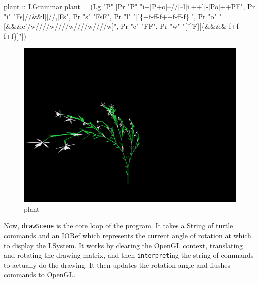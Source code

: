 \documentclass[]{article}
\makeatletter
\newenvironment{Shaded}{}{}
\newcommand{\DataTypeTok}[1]{\textcolor[rgb]{0.56,0.13,0.00}{{#1}}}
\newcommand{\StringTok}[1]{\textcolor[rgb]{0.25,0.44,0.63}{{#1}}}
\newcommand{\OtherTok}[1]{\textcolor[rgb]{0.00,0.44,0.13}{{#1}}}
\newcommand{\FunctionTok}[1]{\textcolor[rgb]{0.02,0.16,0.49}{{#1}}}
\newcommand{\NormalTok}[1]{{#1}}
\def\maxwidth{\ifdim\Gin@nat@width>\linewidth\linewidth
\else\Gin@nat@width\fi}
\let\Oldincludegraphics\includegraphics
\renewcommand{\includegraphics}[1]{\Oldincludegraphics[width=\maxwidth]{#1}}
\makeatother
\begin{document}
\begin{Shaded}
\begin{Highlighting}[]
\OtherTok{plant ::} \DataTypeTok{LGrammar}
\NormalTok{plant  }\FunctionTok{=} \NormalTok{(}\DataTypeTok{Lg} \StringTok{"P"}
          \NormalTok{[}\DataTypeTok{Pr} \StringTok{"P"} \StringTok{"i+[P+o]--//[--l]i[++l]-[Po]++PF"}\NormalTok{,}
           \DataTypeTok{Pr} \StringTok{"i"} \StringTok{"Fs[//&&l][//^^l]Fs"}\NormalTok{,}
           \DataTypeTok{Pr} \StringTok{"s"} \StringTok{"FsF"}\NormalTok{,}
           \DataTypeTok{Pr} \StringTok{"l"} \StringTok{"['\{+f-ff-f+\textbar{}+f-ff-f\}]"}\NormalTok{,}
           \DataTypeTok{Pr} \StringTok{"o"} \StringTok{"[&&&c'/w////w////w////w////w]"}\NormalTok{,}
           \DataTypeTok{Pr} \StringTok{"c"} \StringTok{"FF"}\NormalTok{,}
           \DataTypeTok{Pr} \StringTok{"w"} \StringTok{"['^F][\{&&&&-f+f\textbar{}-f+f\}]"}\NormalTok{])}
\end{Highlighting}
\end{Shaded}
\begin{figure}[htbp]
\centering
\includegraphics{plant.png}
\caption{plant}
\end{figure}

Now, \texttt{drawScene} is the core loop of the program. It takes a
String of turtle commands and an IORef which represents the current
angle of rotation at which to display the LSystem. It works by clearing
the OpenGL context, translating and rotating the drawing matrix, and
then \texttt{interpret}ing the string of commands to actually do the
drawing. It then updates the rotation angle and flushes commands to
OpenGL.
\end{document}
